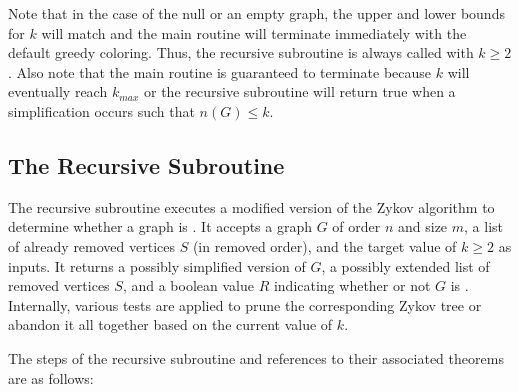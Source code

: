 Note that in the case of the null or an empty graph, the upper and lower bounds for \(k\) will match and the main
routine will terminate immediately with the default greedy coloring.  Thus, the recursive subroutine is always
called with \(k\ge2\).  Also note that the main routine is guaranteed to terminate because \(k\) will eventually
reach \(k_{max}\) or the recursive subroutine will return true when a simplification occurs such that \(n(G)\le k\).

\subsection{The Recursive Subroutine}\label{sec:sub:called}

The recursive subroutine executes a modified version of the Zykov algorithm to determine whether a graph is
.  It accepts a graph \(G\) of order \(n\) and size \(m\), a list of already removed vertices \(S\)
(in removed order), and the target value of \(k\ge2\) as inputs.  It returns a possibly simplified version of
\(G\), a possibly extended list of removed vertices \(S\), and a boolean value \(R\) indicating whether or not
\(G\) is .  Internally, various tests are applied to prune the corresponding Zykov tree or abandon it
all together based on the current value of \(k\).

The steps of the recursive subroutine and references to their associated theorems are as follows:

